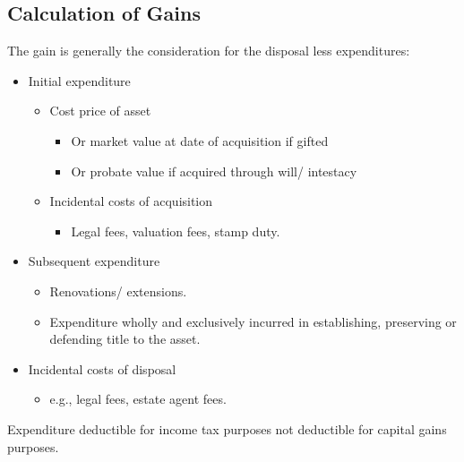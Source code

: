 \documentclass[
]{article}
\newenvironment{Shaded}{}{}
\newcommand{\NormalTok}[1]{#1}
\providecommand{\tightlist}{%
  \setlength{\itemsep}{0pt}\setlength{\parskip}{0pt}}
\begin{document}
\hypertarget{calculation-of-gains}{%
\subsection{Calculation of Gains}\label{calculation-of-gains}}

The gain is generally the consideration for the disposal less
expenditures:

\begin{itemize}
\tightlist
\item
  Initial expenditure

  \begin{itemize}
  \tightlist
  \item
    Cost price of asset

    \begin{itemize}
    \tightlist
    \item
      Or market value at date of acquisition if gifted
    \item
      Or probate value if acquired through will/ intestacy
    \end{itemize}
  \item
    Incidental costs of acquisition

    \begin{itemize}
    \tightlist
    \item
      Legal fees, valuation fees, stamp duty.
    \end{itemize}
  \end{itemize}
\item
  Subsequent expenditure

  \begin{itemize}
  \tightlist
  \item
    Renovations/ extensions.
  \item
    Expenditure wholly and exclusively incurred in establishing,
    preserving or defending title to the asset.
  \end{itemize}
\item
  Incidental costs of disposal

  \begin{itemize}
  \tightlist
  \item
    e.g., legal fees, estate agent fees.
  \end{itemize}
\end{itemize}

\begin{Shaded}
\begin{Highlighting}[]
\NormalTok{Expenditure deductible for income tax purposes not deductible for capital gains purposes.}
\end{Highlighting}
\end{Shaded}
\end{document}
